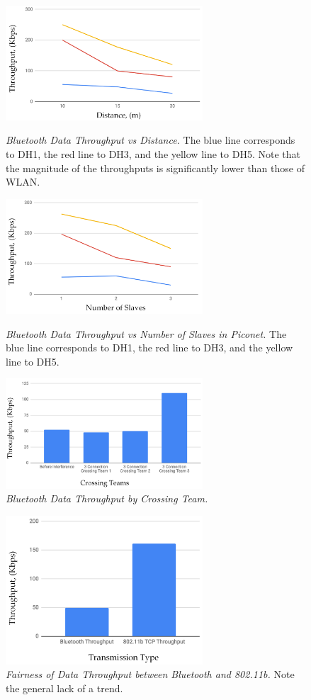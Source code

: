 \documentclass[twoside,twocolumn]{article}
\begin{document}
\newpage

\begin{figure}[!htbp]
    \centering
    \includegraphics[width=2.9in]{BlthDist.png}
    \caption{\textit{Bluetooth Data Throughput vs Distance.} The blue line corresponds to DH1, the red line to DH3, and the yellow line to DH5. Note that the magnitude of the throughputs is significantly lower than those of WLAN.}
    \centering
    \includegraphics[width=2.9in]{BlthSlv.png}
    \caption{\textit{Bluetooth Data Throughput vs Number of Slaves in Piconet.} The blue line corresponds to DH1, the red line to DH3, and the yellow line to DH5.}
    \centering
    \includegraphics[width=2.9in]{Crossing.png}
    \caption{\textit{Bluetooth Data Throughput by Crossing Team.}}
\end{figure}

\begin{figure}[!htbp]
    \centering
    \includegraphics[width=2.9in]{Comp.png}
    \caption{\textit{Fairness of Data Throughput between Bluetooth and 802.11b.} Note the general lack of a trend.}
    \centering
\end{figure}
\end{document}
